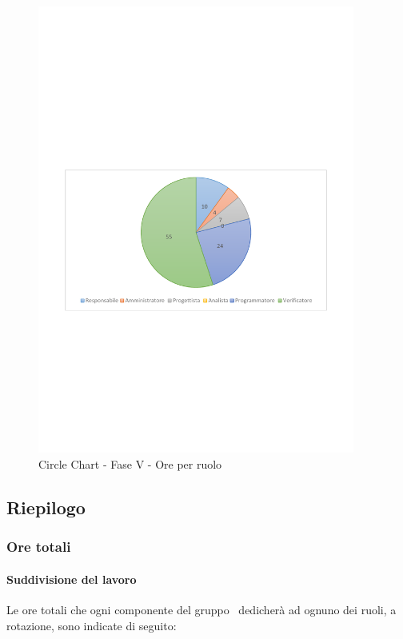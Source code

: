 \documentclass[../PianoProgetto.tex]{subfiles}
\begin{document}
	\begin{figure}[!h]
		\centering
		\includegraphics[width=0.93\textwidth , trim=2cm 9.5cm 2cm 11cm]{grafici/V/V-ore-ruolo}
			\caption{Circle Chart - Fase V - Ore per ruolo}
		\label{fig:CircleChart-faseV_ore_r}
	\end{figure}
	
	
	\subsection{Riepilogo}
			\subsubsection{Ore totali}
				\paragraph{Suddivisione del lavoro}
					Le ore totali che ogni componente del gruppo \leaf\ dedicherà ad ognuno dei ruoli, a rotazione, sono indicate di seguito:
	
\end{document}

